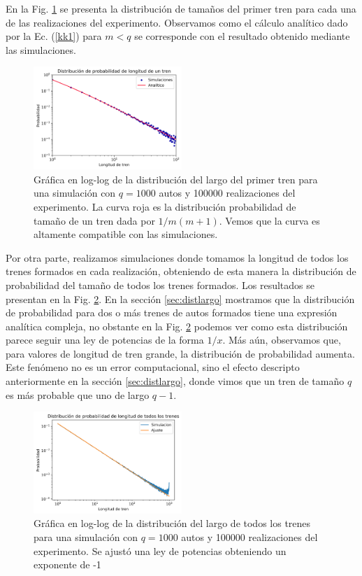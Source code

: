 \documentclass[letterpaper,12pt]{article}
\theoremstyle{plain}
\begin{document}
En la Fig. \ref{fig:kprimer} se presenta la distribución de tamaños del primer tren para cada una de las realizaciones del experimento. Observamos como el cálculo analítico dado por la Ec. (\ref{kk1}) para $m<q$ se corresponde con el resultado obtenido mediante las simulaciones.

\begin{figure}[h]
    \centering
    \includegraphics[width=0.5\textwidth]{kprimer.png}
    \caption{Gráfica en log-log de la distribución del largo del primer tren para una simulación con $q=1000$ autos y 100000 realizaciones del experimento. La curva roja es la distribución probabilidad de tamaño de un tren dada por $1/m(m+1)$. Vemos que la curva es altamente compatible con las simulaciones.}
    \label{fig:kprimer}
\end{figure}

\newpage 

Por otra parte, realizamos simulaciones donde tomamos la longitud de todos los trenes formados en cada realización, obteniendo de esta manera la distribución de probabilidad del tamaño de todos los trenes formados. 
Los resultados se presentan en la Fig. \ref{fig:ktodos}. En la sección \ref{sec:distlargo} mostramos que la distribución de probabilidad para dos o más trenes de autos formados tiene una expresión analítica compleja, no obstante en la Fig. \ref{fig:ktodos} podemos ver como esta distribución parece seguir una ley de potencias de la forma $1/x$. Más aún, observamos que, para valores de longitud de tren grande, la distribución de probabilidad aumenta. Este fenómeno no es un error computacional, sino el efecto descripto anteriormente en la sección  \ref{sec:distlargo}, donde vimos que un tren de tamaño $q$ es más probable que uno de largo $q-1$.

\begin{figure}[h]
    \centering
    \includegraphics[width=0.5\textwidth]{ktodostrenes.png}
    \caption{Gráfica en log-log de la distribución del largo de todos los trenes para una simulación con $q=1000$ autos y 100000 realizaciones del experimento. Se ajustó una ley de potencias obteniendo un exponente de -1}
    \label{fig:ktodos}
\end{figure}
\end{document}
